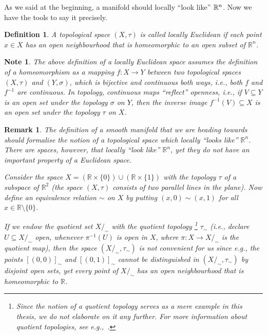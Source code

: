 \documentclass[11pt,a4paper,twoside,openany]{report}
\theoremstyle{my-theorem}
\theoremstyle{non-theorem}
\newtheorem{definition}[theorem]{Definition}
\newtheorem{remark}[theorem]{Remark}
\newtheorem{note}[theorem]{Note}
\begin{document}
		As we said at the beginning, a manifold should locally ``look like'' ${\mathbb R}^n$. Now we have the tools to say it precisely.
		\begin{definition}
			A topological space $(X,\tau)$ is called \emph{locally Euclidean} if each point $x \in X$ has an open neighbourhood that is homeomorphic to an open subset of $\mathbb R^n$.
		\end{definition}
		
		\begin{note}
			The above definition of a locally Euclidean space assumes the definition of a homeomorphism as a mapping $f:X \to Y$ between two topological spaces $(X,\tau)$ and $(Y,\sigma)$, which is bijective and continuous both ways, i.e., both $f$ and $f^{-1}$ are continuous. In topology, continuous maps ``reflect'' openness, i.e., if $V \subseteq Y$ is an open set under the topology $\sigma$ on $Y$, then the inverse image $f^{-1}(V) \subseteq X$ is an open set under the topology $\tau$ on $X$.
		\end{note}
		
		\begin{remark}
			\label{remark:locally-euclidean-not-hausdorff}
			The definition of a smooth manifold that we are heading towards should formalise the notion of a topological space which locally ``looks like'' $\mathbb R^n$. There are spaces, however, that locally ``look like'' $\mathbb R^n$, yet they do not have an important property of a Euclidean space.
			
			Consider the space $X = (\mathbb R \times \{0\}) \cup (\mathbb R \times \{1\})$ with the topology $\tau$ of a subspace of $\mathbb R^2$ (the space $(X,\tau)$ consists of two parallel lines in the plane). Now define an equivalence relation $\sim$ on $X$ by putting $(x,0) \sim (x,1)$ for all $x \in \mathbb R \setminus \{0\}$.
			
			If we endow the quotient set $X/_\sim$ with the quotient topology%
			\footnote{Since the notion of a quotient topology serves as a mere example in this thesis, we do not elaborate on it any further. For more information about quotient topologies, see e.g.,~\cite{engelking:general-topology}.}
			$\tau_\sim$ (i.e., declare $U \subseteq X/_\sim$ open, whenever $\pi^{-1}(U)$ is open in $X$, where $\pi: X \to X/_\sim$ is the quotient map), then the space $(X/_\sim, \tau_\sim)$ is not convenient for us since e.g., the points $[(0,0)]_\sim$ and $[(0,1)]_\sim$ cannot be distinguished in $(X/_\sim,\tau_\sim)$ by disjoint open sets, yet every point of $X/_\sim$ has an open neighbourhood that is homeomorphic to $\mathbb R$.
		\end{remark}
		
\end{document}
